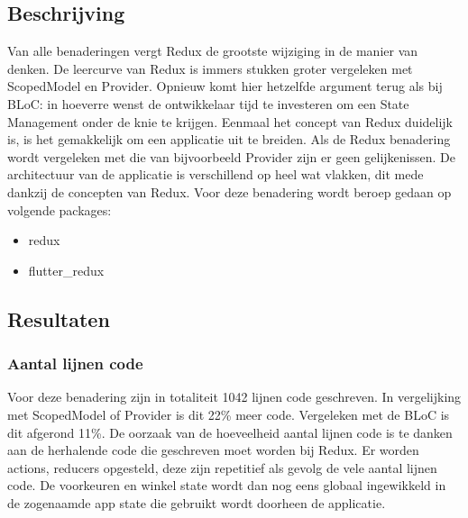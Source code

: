 \subsection{Beschrijving}
Van alle benaderingen vergt Redux de grootste wijziging in de manier van denken. De leercurve van Redux is immers stukken groter vergeleken met ScopedModel en Provider. Opnieuw komt hier hetzelfde argument terug als bij BLoC: in hoeverre wenst de ontwikkelaar tijd te investeren om een State Management onder de knie te krijgen. Eenmaal het concept van Redux duidelijk is, is het gemakkelijk om een applicatie uit te breiden. 
Als de Redux benadering wordt vergeleken met die van bijvoorbeeld Provider zijn er geen gelijkenissen. De architectuur van de applicatie is verschillend op heel wat vlakken, dit mede dankzij de concepten van Redux. \newline \newline
Voor deze benadering wordt beroep gedaan op volgende packages: 
\begin{itemize}
    \item{redux}
    \item{flutter\_redux}
\end{itemize}
\subsection{Resultaten}


\subsubsection{Aantal lijnen code}
Voor deze benadering zijn in totaliteit 1042 lijnen code geschreven. In vergelijking met ScopedModel of Provider is dit 22\% meer code. Vergeleken met de BLoC is dit afgerond 11\%. \newline
De oorzaak van de hoeveelheid aantal lijnen code is te danken aan de herhalende code die geschreven moet worden bij Redux. Er worden actions, reducers opgesteld, deze zijn repetitief als gevolg de vele aantal lijnen code. De voorkeuren en winkel state wordt dan nog eens globaal ingewikkeld in de zogenaamde app state die gebruikt wordt doorheen de applicatie.

